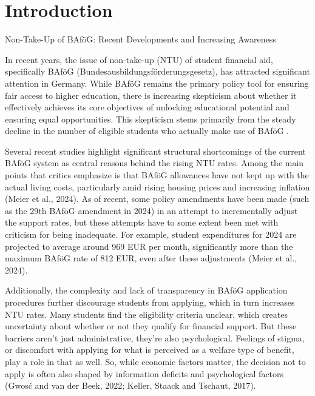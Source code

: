 %
%



\section{Introduction} \label{sec:intro}

Non-Take-Up of BAföG: Recent Developments and Increasing Awareness

In recent years, the issue of non-take-up (NTU) of student financial aid, specifically BAföG (Bundesausbildungsförderungsgesetz), has attracted significant attention in Germany. While BAföG remains the primary policy tool for ensuring fair access to higher education, there is increasing skepticism about whether it effectively achieves its core objectives of unlocking educational potential and ensuring equal opportunities. This skepticism stems primarily from the steady decline in the number of eligible students who actually make use of BAföG \citep{gwosc_krisenbewaltigung_2022, meier_bafog_2024}.

Several recent studies highlight significant structural shortcomings of the current BAföG system as central reasons behind the rising NTU rates. Among the main points that critics emphasize is that BAföG allowances have not kept up with the actual living costs, particularly amid rising housing prices and increasing inflation (Meier et al., 2024). As of recent, some policy amendments have been made (such as the 29th BAföG amendment in 2024) in an attempt to incrementally adjust the support rates, but these attempts have to some extent been met with criticism for being inadequate. For example, student expenditures for 2024 are projected to average around 969 EUR per month, significantly more than the maximum BAföG rate of 812 EUR, even after these adjustments (Meier et al., 2024).

Additionally, the complexity and lack of transparency in BAföG application procedures further discourage students from applying, which in turn increases NTU rates. Many students find the eligibility criteria unclear, which creates uncertainty about whether or not they qualify for financial support. But these barriers aren’t just administrative, they’re also psychological. Feelings of stigma, or discomfort with applying for what is perceived as a welfare type of benefit, play a role in that as well. So, while economic factors matter, the decision not to apply is often also shaped by information deficits and psychological factors (Gwosć and van der Beek, 2022; Keller, Staack and Tschaut, 2017).


